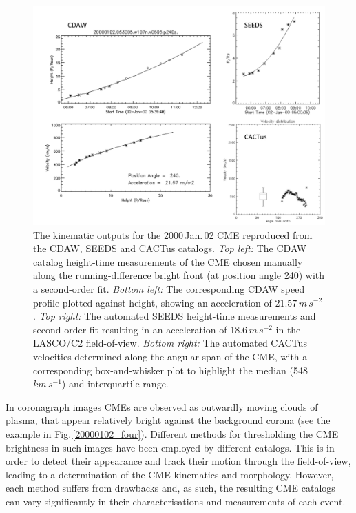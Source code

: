 \documentclass[referee,a4paper,12pt,traditabstract]{swsc}
\begin{document}
\begin{linenumbers}
\begin{figure}[!h]
\centerline{\includegraphics[scale=0.68, trim=20 0 0 0, clip=true]{images/20000102_kins_plots.pdf}}
\caption{The kinematic outputs for the 2000\,Jan.\,02 CME reproduced from the CDAW, SEEDS and CACTus catalogs. \emph{Top left:} The CDAW catalog height-time measurements of the CME chosen manually along the running-difference bright front (at position angle 240) with a second-order fit. \emph{Bottom left:} The corresponding CDAW speed profile plotted against height, showing an acceleration of $21.57\,m\,s^{-2}$. \emph{Top right:} The automated SEEDS height-time measurements and second-order fit resulting in an acceleration of 18.6\,$m\,s^{-2}$ in the LASCO/C2 field-of-view. \emph{Bottom right:} The automated CACTus velocities determined along the angular span of the CME, with a corresponding box-and-whisker plot to highlight the median (548\,$km\,s^{-1}$) and interquartile range.}
\label{20000102_kins_plots}
\end{figure}

In coronagraph images CMEs are observed as outwardly moving clouds of plasma, that appear relatively bright against the background corona (see the example in Fig.\,\ref{20000102_four}). Different methods for thresholding the CME brightness in such images have been employed by different catalogs. This is in order to detect their appearance and track their motion through the field-of-view, leading to a determination of the CME kinematics and morphology. However, each method suffers from drawbacks and, as such, the resulting CME catalogs can vary significantly in their characterisations and measurements of each event. 



\end{linenumbers}
\end{document}
